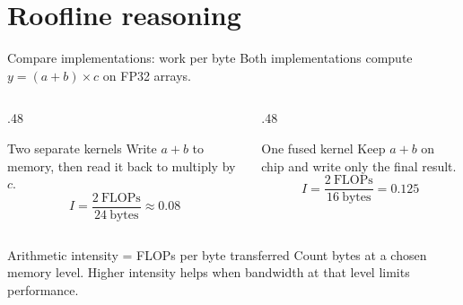 \documentclass[handout]{beamer}
\begin{document}
\section{Roofline reasoning}

\begin{frame}{Compare implementations: work per byte}
  Both implementations compute $y=(a+b)\times c$ on FP32 arrays.
  \vspace{4pt}
  \begin{columns}[t]
    \begin{column}{.48\linewidth}
      \begin{block}{Two separate kernels}
        Write $a+b$ to memory, then read it back to multiply by $c$.
        \[
          I=\frac{2\ \text{FLOPs}}{24\ \text{bytes}}\approx 0.08
        \]
      \end{block}
    \end{column}
    \begin{column}{.48\linewidth}
      \begin{block}{One fused kernel}
        Keep $a+b$ on chip and write only the final result.
        \[
          I=\frac{2\ \text{FLOPs}}{16\ \text{bytes}}=0.125
        \]
      \end{block}
    \end{column}
  \end{columns}
  \vspace{3pt}
  \begin{alertblock}{Arithmetic intensity = FLOPs per byte transferred}
    Count bytes at a chosen memory level. Higher intensity helps when bandwidth at that level limits performance.
  \end{alertblock}
\end{frame}
\end{document}
